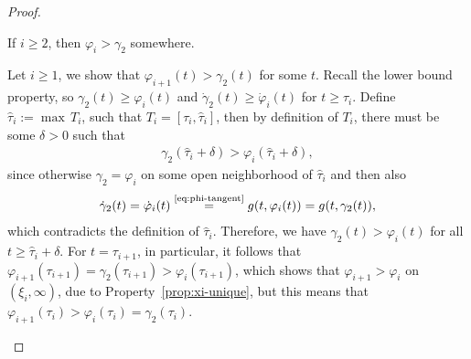 \documentclass[a4paper]{article}
\theoremstyle{definition}
\theoremstyle{plain}
\begin{document}
\begin{proof}
\begin{outline}




  \1 If $i \geq 2$, then $\varphi_{i} > \gamma_{2}$ somewhere.

  \2 Let $i \geq 1$, we show that $\varphi_{i+1}(t) > \gamma_{2}(t)$ for some $t$.
  Recall the lower bound property, so $\gamma_{2}(t) \geq \varphi_{i}(t)$ and
  $\dot{\gamma}_{2}(t) \geq \dot{\varphi}_{i}(t)$ for $t \geq \tau_{i}$.
  Define $\hat{\tau}_{i} := \max \, T_{i}$, such that
  $T_{i} = [\tau_{i}, \hat{\tau}_{i}]$, then by definition of $T_{i}$, there
  must be some $\delta > 0$ such that
  \begin{align}
    \gamma_{2}(\hat{\tau}_{i} + \delta) > \varphi_{i}(\hat{\tau}_{i} + \delta) ,
  \end{align}
  since otherwise $\gamma_{2} = \varphi_{i}$ on some open neighborhood of
  $\hat{\tau}_{i}$ and then also
  \begin{align}
    \dot{\gamma}_{2}(t) = \dot{\varphi}_{i}(t) \overset{\text{\eqref{eq:phi-tangent}}}{=} g(t, \varphi_{i}(t)) = g(t, \gamma_{2}(t)),
  \end{align}
  which contradicts the definition of $\hat{\tau}_{i}$.
  Therefore, we have $\gamma_{2}(t) > \varphi_{i}(t)$ for all $t \geq \hat{\tau}_{i} + \delta$. For
  $t = \tau_{i+1}$, in particular, it follows that
  $\varphi_{i+1}(\tau_{i+1}) = \gamma_{2}(\tau_{i+1}) > \varphi_{i}(\tau_{i+1})$, which shows that
  $\varphi_{i+1} > \varphi_{i}$ on $(\xi_{i}, \infty)$, due to Property~\ref{prop:xi-unique}, but this means that
  $\varphi_{i+1}(\tau_{i}) > \varphi_{i}(\tau_{i}) = \gamma_{2}(\tau_{i})$.


\end{outline}
\end{proof}
\end{document}
